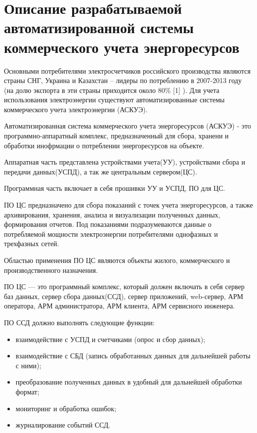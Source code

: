 \newpage
\section{Описание разрабатываемой автоматизированной системы коммерческого учета энергоресурсов}
\setcounter{figure}{0}

Основными  потребителями  электросчетчиков российского производства являются страны СНГ, Украина и Казахстан – лидеры по потреблению в 2007-2013 году (на долю экспорта в эти страны приходится около  80\% [1] ). Для учета использования электроэнергии существуют автоматизированные системы коммерческого учета электроэнергии (АСКУЭ).

Автоматизированная система коммерческого учета энергоресурсов (АСКУЭ) - это программно-аппаратный комплекс, предназначенный для сбора, хранени и обработки инофрмации о потреблении энергоресурсов на объекте. 

Аппаратная часть представлена устройствами учета(УУ), устройствами сбора и передачи данных(УСПД), а так же центральным сервером(ЦС).

Программная часть включает в себя прошивки УУ и УСПД, ПО для ЦС.

ПО ЦС предназначено для сбора показаний с точек учета энергоресурсов, а также архивирования, хранения, анализа и визуализации полученных данных, формирования отчетов. Под показаниями подразумеваются данные о потребляемой мощности электроэнергии потребителями однофазных и трехфазных сетей.

Областью применения ПО ЦС являются объекты жилого, коммерческого и производственного назначения.

ПО ЦС — это программный комплекс, который должен включать в себя сервер баз данных, сервер сбора данных(ССД), сервер приложений, web-сервер, АРМ оператора, АРМ администратора, АРМ клиента, АРМ сервисного инженера.

ПО ССД должно выполнять следующие функции:
\begin{itemize}
 \item взаимодействие с УСПД и счетчиками (опрос и сбор данных);
 \item взаимодействие с СБД (запись обработанных данных для дальнейшей работы с ними);
 \item преобразование полученных данных в удобный для дальнейшей обработки формат;
 \item мониторинг и обработка ошибок;
 \item журналирование событий ССД.
\end{itemize}

